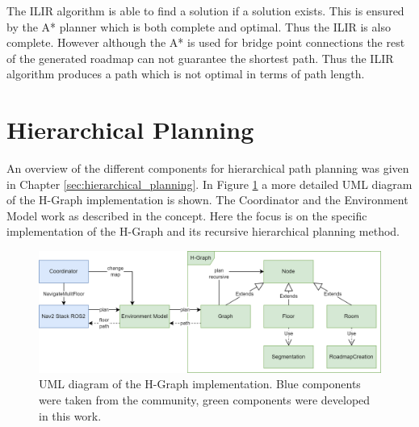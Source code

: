 The ILIR algorithm is able to find a solution if a solution exists. This is ensured by the A* planner which is both complete and optimal. Thus the ILIR is also complete. However although the A* is used for bridge point connections the rest of the generated roadmap can not guarantee the shortest path. Thus the ILIR algorithm produces a path which is not optimal in terms of path length.


\section{Hierarchical Planning}
\label{sec:impl_hierarchical_planning}
An overview of the different components for hierarchical path planning was given in Chapter \ref{sec:hierarchical_planning}. In Figure \ref{fig:h_graph_uml} a more detailed UML diagram of the H-Graph implementation is shown. The Coordinator and the Environment Model work as described in the concept. Here the focus is on the specific implementation of the H-Graph and its recursive hierarchical planning method.

\begin{figure}[h]
    \centering
    \includegraphics[width=\textwidth]{figures/50_implementation/h_graph_uml.png}
    \caption[UML diagram of the H-Graph implementation]{UML diagram of the H-Graph implementation. Blue components were taken from the community, green components were developed in this work.}
    \label{fig:h_graph_uml}
\end{figure}

